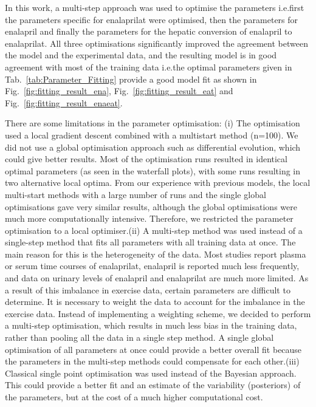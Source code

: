 \documentclass[pharmaceutics,article,submit,pdftex,moreauthors]{Definitions/mdpi}
\begin{document}
In this work, a multi-step approach was used to optimise the parameters i.e.\@ first the parameters specific for enalaprilat were optimised, then the parameters for enalapril and finally the parameters for the hepatic conversion of enalapril to enalaprilat. All three optimisations significantly improved the agreement between the model and the experimental data, and the resulting model is in good agreement with most of the training data i.e.\@ the optimal parameters given in Tab.~\ref{tab:Parameter_Fitting} provide a good model fit as shown in Fig.~\ref{fig:fitting_result_ena}, Fig.~\ref{fig:fitting_result_eat} and Fig.~\ref{fig:fitting_result_enaeat}. 

There are some limitations in the parameter optimisation: (i) The optimisation used a local gradient descent combined with a multistart method (n=100). We did not use a global optimisation approach such as differential evolution, which could give better results. Most of the optimisation runs resulted in identical optimal parameters (as seen in the waterfall plots), with some runs resulting in two alternative local optima. From our experience with previous models, the local multi-start methods with a large number of runs and the single global optimisations gave very similar results, although the global optimisations were much more computationally intensive. Therefore, we restricted the parameter optimisation to a local optimiser.\@ (ii) A multi-step method was used instead of a single-step method that fits all parameters with all training data at once. The main reason for this is the heterogeneity of the data. Most studies report plasma or serum time courses of enalaprilat, enalapril is reported much less frequently, and data on urinary levels of enalapril and enalaprilat are much more limited. As a result of this imbalance in exercise data, certain parameters are difficult to determine. It is necessary to weight the data to account for the imbalance in the exercise data. Instead of implementing a weighting scheme, we decided to perform a multi-step optimisation, which results in much less bias in the training data, rather than pooling all the data in a single step method. A single global optimisation of all parameters at once could provide a better overall fit because the parameters in the multi-step methods could compensate for each other.\@ (iii) Classical single point optimisation was used instead of the Bayesian approach. This could provide a better fit and an estimate of the variability (posteriors) of the parameters, but at the cost of a much higher computational cost. 
\end{document}
